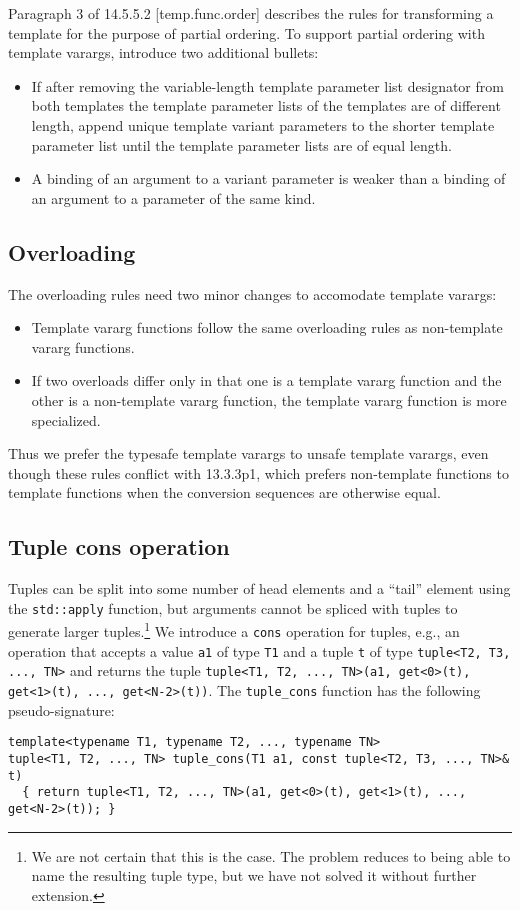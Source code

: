 \documentclass{article}
\begin{document}
Paragraph 3 of 14.5.5.2 [temp.func.order] describes the rules for
transforming a template for the purpose of partial ordering. To
support partial ordering with template varargs, introduce two
additional bullets:
\begin{itemize}
\item If after removing the variable-length template parameter list
  designator from both templates the template parameter lists of the
  templates are of different length, append unique template variant
  parameters to the shorter template parameter list until the template
  parameter lists are of equal length.
\item A binding of an argument to a variant parameter is weaker than a
  binding of an argument to a parameter of the same kind.
\end{itemize}

\subsection{Overloading}
\label{overloading}
The overloading rules need two minor changes to accomodate template
varargs:
\begin{itemize}
\item Template vararg functions follow the same overloading rules as
  non-template vararg functions.
\item If two overloads differ only in that one is a template vararg
  function and the other is a non-template vararg function, the
  template vararg function is more specialized.
\end{itemize}

Thus we prefer the typesafe template varargs to unsafe template
varargs, even though these rules conflict with 13.3.3p1,
which prefers non-template functions to template functions when the
conversion sequences are otherwise equal. 

\subsection{Tuple cons operation}
Tuples can be split into some number of head elements and a ``tail''
element using the {\tt std::apply} function, but arguments cannot be
spliced with tuples to generate larger tuples.\footnote{We are not
  certain that this is the case. The problem reduces to being able to
  name the resulting tuple type, but we have not solved it without
  further extension.} We introduce a {\tt cons} operation for tuples,
e.g., an operation that accepts a value {\tt a1} of type {\tt T1} and
a tuple {\tt t} of type {\tt tuple<T2, T3, ..., TN>} and returns the
tuple {\tt tuple<T1, T2, ..., TN>(a1, get<0>(t), get<1>(t), ...,
  get<N-2>(t))}. The {\tt tuple\_cons} function has the following
pseudo-signature:
\begin{verbatim}
template<typename T1, typename T2, ..., typename TN>
tuple<T1, T2, ..., TN> tuple_cons(T1 a1, const tuple<T2, T3, ..., TN>& t)
  { return tuple<T1, T2, ..., TN>(a1, get<0>(t), get<1>(t), ..., get<N-2>(t)); }
\end{verbatim}
\end{document}
